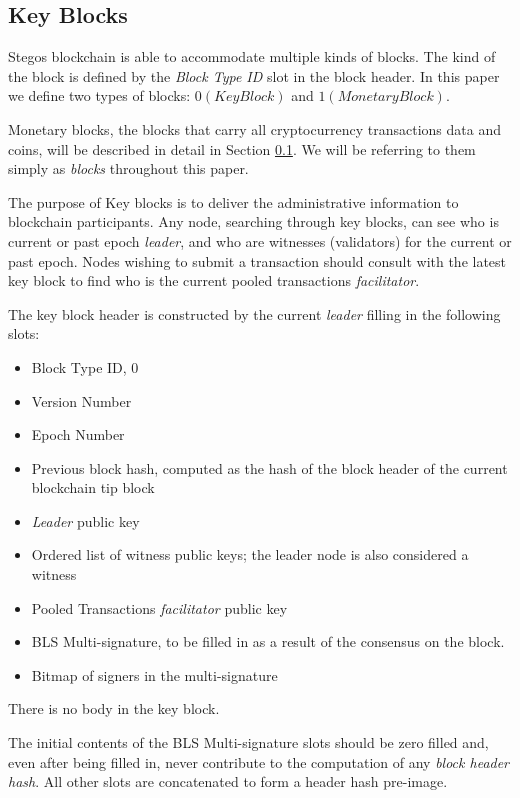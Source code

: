 \documentclass[a4paper, 10pt, conference]{ieeeconf}
\begin{document}
\subsection{Key Blocks}\label{Blocks}

Stegos blockchain is able to accommodate multiple kinds of blocks. The kind of the block is defined by the \textit{Block Type ID} slot in the block header. In this paper we define two types of blocks: $0 (KeyBlock)$ and $1 (MonetaryBlock)$.

Monetary blocks, the blocks that carry all cryptocurrency transactions data and coins, will be described in detail in Section \ref{Blocks}. We will be referring to them simply as \textit{blocks} throughout this paper. 

The purpose of Key blocks is to deliver the administrative information to blockchain participants. Any node, searching through key blocks, can see who is current or past epoch \textit{leader}, and who are witnesses (validators) for the current or past epoch. Nodes wishing to submit a transaction should consult with the latest key block to find who is the current pooled transactions \textit{facilitator}.

The key block header is constructed by the current \textit{leader} filling in the following slots:

\begin{itemize}
	\item {Block Type ID, 0}
	\item {Version Number}
	\item {Epoch Number}
	\item {Previous block hash, computed as the hash of the block header of the current blockchain tip block}
	\item {\textit{Leader} public key}
	\item {Ordered list of witness public keys; the leader node is also considered a witness}
	\item {Pooled Transactions \textit{facilitator} public key}
	\item {BLS Multi-signature, to be filled in as a result of the consensus on the block.}
	\item {Bitmap of signers in the multi-signature}
\end{itemize}

There is no body in the key block.

The initial contents of the BLS Multi-signature slots should be zero filled and, even after being filled in, never contribute to the computation of any \textit{block header hash}. All other slots are concatenated to form a header hash pre-image.
\end{document}
